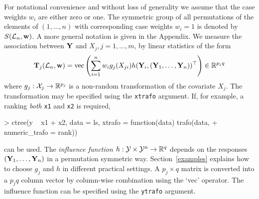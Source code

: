 \documentclass[letter]{article}
\begin{document}
For notational convenience and without loss of generality we assume that the
case weights $w_i$ are either zero or one. The symmetric group of all
permutations of  the elements of $(1, \dots, n)$ with corresponding case
weights $w_i = 1$ is denoted by $S(\mathcal{L}_n, \mathbf{w})$. A more general notation is
given in the Appendix. We measure the association between $\mathbf{Y}$ and $X_j, j = 1, \dots, m$, 
by linear statistics of the form
\begin{eqnarray} \label{linstat}
\mathbf{T}_j(\mathcal{L}_n, \mathbf{w}) = \text{vec} \left( \sum_{i=1}^n w_i g_j(X_{ji})
h(\mathbf{Y}_i, (\mathbf{Y}_1, \dots, \mathbf{Y}_n))^\top \right) \in \mathbb{R}^{p_jq}
\end{eqnarray}
where $g_j: \mathcal{X}_j \rightarrow \mathbb{R}^{p_j}$ is a non-random transformation of
the covariate $X_j$. The transformation may be specified using the
\texttt{xtrafo} argument. If, for example, a ranking \textit{both}
\texttt{x1} and \texttt{x2} is required,
\begin{Schunk}
\begin{Sinput}
> ctree(y ~ x1 + x2, data = ls, xtrafo = function(data) trafo(data, 
+     numeric_trafo = rank))
\end{Sinput}
\end{Schunk}
can be used. The \emph{influence function} 
$h: \mathcal{Y} \times \mathcal{Y}^n \rightarrow
\mathbb{R}^q$ depends on the responses $(\mathbf{Y}_1, \dots, \mathbf{Y}_n)$ in a permutation
symmetric way. 
Section~\ref{examples} explains how to choose $g_j$ and $h$ in different 
practical settings. A $p_j \times q$ matrix is converted into a 
$p_jq$ column vector by column-wise combination using the `vec' operator. 
The influence function can be specified using the \texttt{ytrafo} argument.
\end{document}
